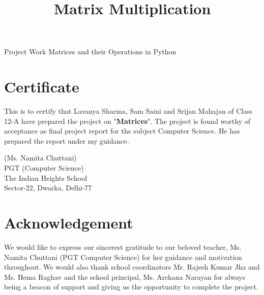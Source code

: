 


\lstset{style=mystyle}
\title{Matrix Multiplication}


\begin{titlepage}
	\begin{center}
		\huge Project Work \vfil
		Matrices and their Operations in Python\\

	\end{center}
\end{titlepage}
\tableofcontents
\newpage
\section*{Certificate}
This is to certify that Lavanya Sharma, Sam Saini and Srijan Mahajan of Class 12-A have prepared the project on "\textbf{Matrices}". The project is found worthy of acceptance as final project report for the subject Computer Science. He has prepared the report under my guidance.
\vfill
\begin{flushright}
	(Ms. Namita Chuttani)\\
	PGT (Computer Science)\\
	The Indian Heights School\\
	Sector-22, Dwarka, Delhi-77
\end{flushright}
\newpage
\section*{Acknowledgement}
We would like to express our sincerest gratitude to our beloved teacher, Ms. Namita Chuttani (PGT Computer Science) for her guidance and motivation throughout. We would also thank school coordinators Mr. Rajesh Kumar Jha and Ms. Hema Raghav and the school principal, Ms. Archana Narayan for always being a beacon of support and giving us the opportunity to complete the project. 

